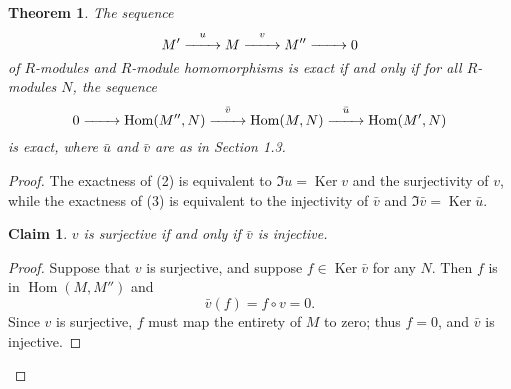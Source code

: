 \documentclass[11pt]{article}
\newtheorem{theorem}{Theorem}
\newtheorem{claim}{Claim}
\newcommand{\Hom}{\operatorname{Hom}}
\newcommand{\Ker}{\operatorname{Ker}}
\renewcommand{\longrightarrow}{\xrightarrow{\hspace*{0.7cm}}}
\begin{document}
\begin{adjustwidth}{0.5cm}{}
	\begin{theorem}
		The sequence
		\begin{equation}
			M' \stackrel{u}{\longrightarrow} M \stackrel{v}{\longrightarrow} M'' \longrightarrow 0
		\end{equation}
		of $R$-modules and $R$-module homomorphisms is exact if and only if for all $R$-modules $N$, the sequence
		\begin{equation}
			0 \longrightarrow \Hom(M'', N) \stackrel{\bar{v}}{\longrightarrow} \Hom(M, N) \stackrel{\bar{u}}{\longrightarrow} \Hom(M', N)
		\end{equation}
		is exact, where $\bar{u}$ and $\bar{v}$ are as in Section 1.3.
	\end{theorem}
	\newpage
	\begin{proof}
		The exactness of (2) is equivalent to $\Im u = \Ker v$ and the surjectivity of $v$, while the exactness of (3) is equivalent to the injectivity of $\bar{v}$ and $\Im \bar{v} = \Ker \bar{u}$.
		\begin{adjustwidth}{0.5cm}{}
			\begin{claim}
				$v$ is surjective if and only if $\bar{v}$ is injective.
			\end{claim}
			\begin{proof}\renewcommand{\qedsymbol}{}
				Suppose that $v$ is surjective, and suppose $f \in \Ker \bar{v}$ for any $N$. Then $f$ is in $\Hom(M, M'')$ and
				\[
					\bar{v}(f) = f \circ v = 0.
				\]
				Since $v$ is surjective, $f$ must map the entirety of $M$ to zero; thus $f = 0$, and $\bar{v}$ is injective.


\end{proof}
\end{adjustwidth}
\end{proof}
\end{adjustwidth}
\end{document}
